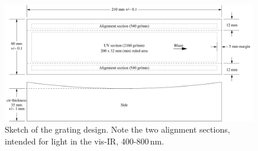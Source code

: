 \documentclass[12pt]{article}
\begin{document}
\begin{figure}
   \begin{center}
      \includegraphics[width=0.99\textwidth]{sketch.pdf}
   \end{center}
   \caption{Sketch of the grating design. Note the two alignment sections, intended for 
      light in the vis-IR, 400-800\,nm.}\label{fig:sketch}
\end{figure}
\end{document}
